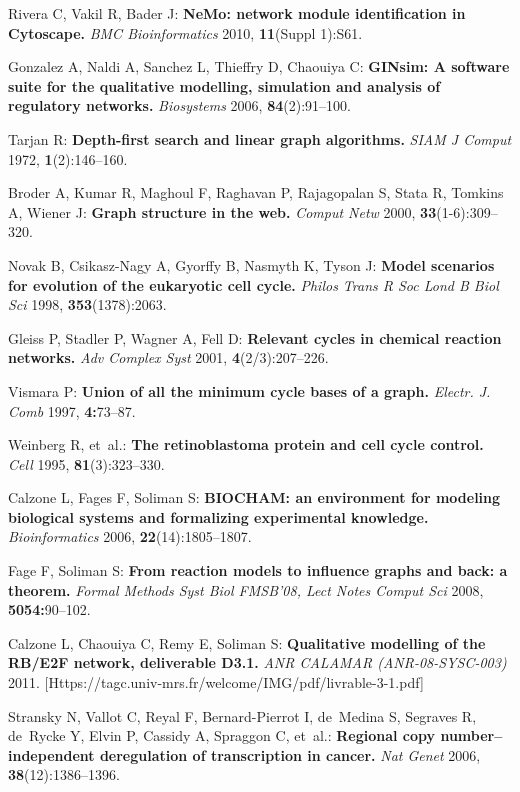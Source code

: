 \documentclass[11pt]{bmc_article_s50}
\begin{document}
\begin{thebibliography}{10}
Rivera C, Vakil R, Bader J: \textbf{NeMo: network module identification in
  Cytoscape.} \emph{BMC Bioinformatics} 2010, \textbf{11}(Suppl 1):S61.

Gonzalez A, Naldi A, Sanchez L, Thieffry D, Chaouiya C: \textbf{GINsim: A
  software suite for the qualitative modelling, simulation and analysis of
  regulatory networks.} \emph{Biosystems} 2006, \textbf{84}(2):91--100.

Tarjan R: {\bf Depth-first search and linear graph algorithms.} \textit{SIAM J Comput}  1972, \textbf{1}(2):{146--160}.

Broder A, Kumar R, Maghoul F, Raghavan P, Rajagopalan S, Stata R, Tomkins A,
  Wiener J: \textbf{Graph structure in the web.} \emph{Comput Netw} 2000,
  \textbf{33}(1-6):309--320.

Novak B, Csikasz-Nagy A, Gyorffy B, Nasmyth K, Tyson J: \textbf{Model scenarios
  for evolution of the eukaryotic cell cycle.} \emph{Philos Trans R Soc Lond B Biol Sci} 1998,
  \textbf{353}(1378):2063.

Gleiss P, Stadler P, Wagner A, Fell D: \textbf{Relevant cycles in chemical
  reaction networks.} \emph{Adv Complex Syst} 2001,
  \textbf{4}(2/3):207--226.

Vismara P: \textbf{Union of all the minimum cycle bases of a graph.}
  \emph{Electr. J. Comb} 1997, \textbf{4:}73--87.

Weinberg R, et~al.: \textbf{The retinoblastoma protein and cell cycle control.}
  \emph{Cell} 1995, \textbf{81}(3):323--330.

Calzone L, Fages F, Soliman S: \textbf{BIOCHAM: an environment for modeling
  biological systems and formalizing experimental knowledge.}
  \emph{Bioinformatics} 2006, \textbf{22}(14):1805--1807.

Fage F, Soliman S: \textbf{From reaction models to influence graphs and back: a
  theorem.} \emph{Formal Methods Syst Biol FMSB'08, Lect Notes
  Comput Sci} 2008, \textbf{5054:}90--102.


Calzone L, Chaouiya C, Remy E, Soliman S: \textbf{Qualitative modelling of the
  RB/E2F network, deliverable D3.1.} \emph{ANR CALAMAR (ANR-08-SYSC-003)} 2011.
  [Https://tagc.univ-mrs.fr/welcome/IMG/pdf/livrable-3-1.pdf]

Stransky N, Vallot C, Reyal F, Bernard-Pierrot I, de~Medina S, Segraves R,
  de~Rycke Y, Elvin P, Cassidy A, Spraggon C, et~al.: \textbf{Regional copy
  number--independent deregulation of transcription in cancer.} \emph{Nat
  Genet} 2006, \textbf{38}(12):1386--1396.

\end{thebibliography}
\end{document}
